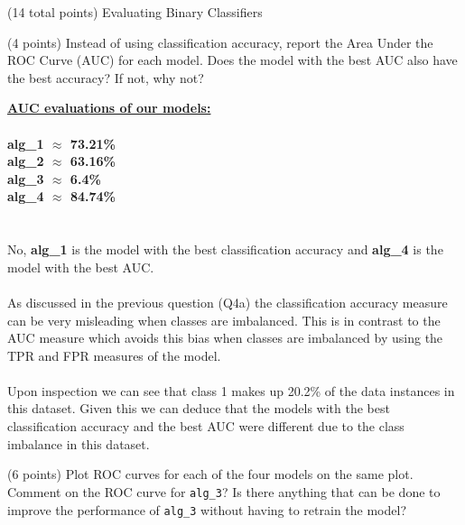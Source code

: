 \documentclass[12pt]{article}
\begin{document}
\begin{question}{(14 total points) Evaluating Binary Classifiers}
\begin{subquestion}
\end{subquestion}



%
%
\begin{subquestion}{(4 points) Instead of using classification accuracy, report the Area Under the ROC Curve (AUC) for each model. 
Does the model with the best AUC also have the best accuracy? If not, why not?\\
}


\begin{answerbox}{27em}
\large{\textbf{\underline{AUC evaluations of our models:}}}\\
\\
\normalsize{\textbf{alg\_1 $\approx$ 73.21\%}}\\
\normalsize{\textbf{alg\_2 $\approx$ 63.16\%}}\\
\normalsize{\textbf{alg\_3 $\approx$ 6.4\%}}\\
\normalsize{\textbf{alg\_4 $\approx$ \textcolor{OliveGreen}{84.74\%}}}\\
\\
\\
\normalsize{
No, \textbf{alg\_1} is the model with the best classification accuracy and \textbf{alg\_4} is the model with the best AUC.\\
\\
As discussed in the previous question (Q4a) the classification accuracy measure can be very misleading when classes are imbalanced. This is in contrast to the AUC measure which avoids this bias when classes are imbalanced by using the TPR and FPR measures of the model.\\ 
\\
Upon inspection we can see that class 1 makes up 20.2\% of the data instances in this dataset. Given this we can deduce that the models with the best classification accuracy and the best AUC were different due to the class imbalance in this dataset.
}
\end{answerbox}



\end{subquestion}



%
%
\begin{subquestion}{(6 points) Plot ROC curves for each of the four models on the same plot.
Comment on the ROC curve for \texttt{alg\_3}?
Is there anything that can be done to improve the performance of \texttt{alg\_3} without having to retrain the model?\\
}



\end{subquestion}
\end{question}
\end{document}
